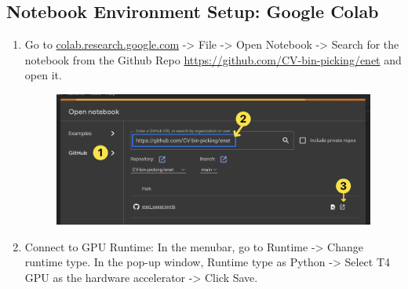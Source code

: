 \subsection*{Notebook Environment Setup: Google Colab}
\begin{enumerate}
    \item Go to \url{colab.research.google.com} -> File -> Open Notebook -> Search for the notebook from the Github Repo \url{https://github.com/CV-bin-picking/enet} and open it.
          \begin{figure}[H]
              \centering
              \includegraphics[width=450pt]{assets/enet/camvid/open.png}
              \label{fig:using:test1}
          \end{figure}
    \item Connect to GPU Runtime: In the menubar, go to Runtime -> Change runtime type. In the pop-up window, Runtime type as Python -> Select T4 GPU as the hardware accelerator -> Click Save.


\end{enumerate}
